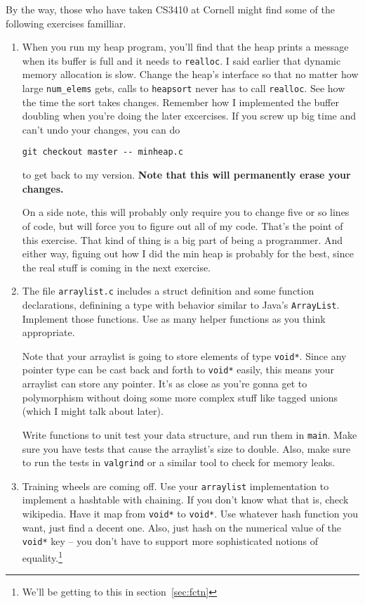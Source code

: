 \documentclass[ebook,11pt,oneside,openany]{memoir}
\newcommand{\cf}[1]{\texttt{#1}}
\begin{document}
By the way, those who have taken CS3410 at Cornell might find some of the following exercises familliar.

\begin{enumerate}

\item When you run my heap program, you'll find that the heap prints a message when its buffer is full and it needs to \cf{realloc}. I said earlier that dynamic memory allocation is slow. Change the heap's interface so that no matter how large \cf{num\_elems} gets, calls to \cf{heapsort} never has to call \cf{realloc}. See how the time the sort takes changes. Remember how I implemented the buffer doubling when you're doing the later excercises. If you screw up big time and can't undo your changes, you can do

\begin{verbatim}
git checkout master -- minheap.c
\end{verbatim}

\noindent
to get back to my version. \textbf{Note that this will permanently erase your changes.}

On a side note, this will probably only require you to change five or so lines of code, but will force you to figure out all of my code. That's the point of this exercise. That kind of thing is a big part of being a programmer. And either way, figuing out how I did the min heap is probably for the best, since the real stuff is coming in the next exercise.

\item The file \cf{arraylist.c} includes a struct definition and some function declarations, definining a type with behavior similar to Java's \cf{ArrayList}. Implement those functions. Use as many helper functions as you think appropriate.

Note that your arraylist is going to store elements of type \cf{void*}. Since any pointer type can be cast back and forth to \cf{void*} easily, this means your arraylist can store any pointer. It's as close as you're gonna get to polymorphism without doing some more complex stuff like tagged unions (which I might talk about later).

Write functions to unit test your data structure, and run them in \cf{main}. Make sure you have tests that cause the arraylist's size to double. Also, make sure to run the tests in \cf{valgrind} or a similar tool to check for memory leaks.

\item Training wheels are coming off. Use your \cf{arraylist} implementation to implement a hashtable with chaining. If you don't know what that is, check wikipedia. Have it map from \cf{void*} to \cf{void*}. Use whatever hash function you want, just find a decent one. Also, just hash on the numerical value of the \cf{void*} key -- you don't have to support more sophisticated notions of equality.\footnote{We'll be getting to this in section~\ref{sec:fctn}}


\end{enumerate}
\end{document}
